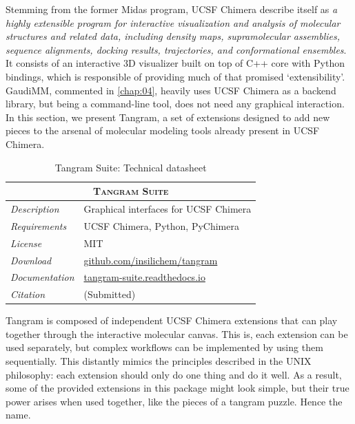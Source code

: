 Stemming from the former Midas program, UCSF Chimera describe itself as \textit{a highly extensible program for interactive visualization and analysis of molecular structures and related data, including density maps, supramolecular assemblies, sequence alignments, docking results, trajectories, and conformational ensembles}. It consists of an interactive 3D visualizer built on top of C++ core with Python bindings, which is responsible of providing much of that promised ‘extensibility’. GaudiMM, commented in \autoref{chap:04}, heavily uses UCSF Chimera as a backend library, but being a command-line tool, does not need any graphical interaction. In this section, we present Tangram, a set of extensions designed to add new pieces to the arsenal of molecular modeling tools already present in UCSF Chimera.


 \begin{table}[hbtp]
	\caption{Tangram Suite: Technical datasheet}
	\footnotesize
	\newcommand{\tableheading}[1]{\multicolumn{2}{c}{\textsc{#1}}}
	\begin{tabularx}{\textwidth}{RL}
		\toprule
		\tableheading{Tangram Suite}\\
		\toprule
		\textit{Description} & Graphical interfaces for UCSF Chimera\\
		\midrule
		\textit{Requirements} & UCSF Chimera, Python, PyChimera\\
		\midrule
		\textit{License} & MIT\\
		\midrule
		\textit{Download} & \href{https://github.com/insilichem/tangram}{github.com/insilichem/tangram} \\
		\midrule
		\textit{Documentation} & \href{http://tangram-suite.readthedocs.io}{tangram-suite.readthedocs.io} \\
		\midrule
		\textit{Citation} & (Submitted)\\
		\bottomrule

	\end{tabularx}
\end{table}




Tangram is composed of independent UCSF Chimera extensions that can play together through the interactive molecular canvas. This is, each extension can be used separately, but complex workflows can be implemented by using them sequentially. This distantly mimics the principles described in the UNIX philosophy: each extension should only do one thing and do it well.\cite{raymond2003art} As a result, some of the provided extensions in this package might look simple, but their true power arises when used together, like the pieces of a tangram puzzle. Hence the name.

